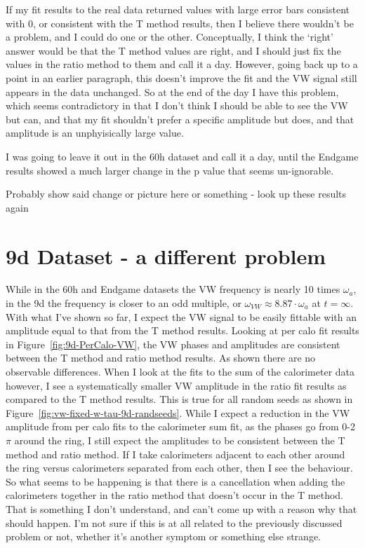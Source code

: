 \documentclass[12pt,letterpaper]{article}
\newcommand{\figref}[1]{Figure~\ref{#1}}
\def\wa{$\omega_{a}$\xspace}
\begin{document}
If my fit results to the real data returned values with large error bars consistent with 0, or consistent with the T method results, then I believe there wouldn't be a problem, and I could do one or the other. Conceptually, I think the `right' answer would be that the T method values are right, and I should just fix the values in the ratio method to them and call it a day. However, going back up to a point in an earlier paragraph, this doesn't improve the fit and the VW signal still appears in the data unchanged. So at the end of the day I have this problem, which seems contradictory in that I don't think I should be able to see the VW but can, and that my fit shouldn't prefer a specific amplitude but does, and that amplitude is an unphyisically large value. 


I was going to leave it out in the 60h dataset and call it a day, until the Endgame results showed a much larger change in the p value that seems un-ignorable.


Probably show said change or picture here or something - look up these results again






\section{9d Dataset - a different problem}


While in the 60h and Endgame datasets the VW frequency is nearly 10 times \wa, in the 9d the frequency is closer to an odd multiple, or $\omega_{VW} \approx 8.87 \cdot \omega_{a}$ at $t = \infty$. With what I've shown so far, I expect the VW signal to be easily fittable with an amplitude equal to that from the T method results. Looking at per calo fit results in \figref{fig:9d-PerCalo-VW}, the VW phases and amplitudes are consistent between the T method and ratio method results. As shown there are no observable differences. When I look at the fits to the sum of the calorimeter data however, I see a systematically smaller VW amplitude in the ratio fit results as compared to the T method results. This is true for all random seeds as shown in \figref{fig:vw-fixed-w-tau-9d-randseeds}. While I expect a reduction in the VW amplitude from per calo fits to the calorimeter sum fit, as the phases go from 0-2$\pi$ around the ring, I still expect the amplitudes to be consistent between the T method and ratio method. If I take calorimeters adjacent to each other around the ring versus calorimeters separated from each other, then I see the behaviour. So what seems to be happening is that there is a cancellation when adding the calorimeters together in the ratio method that doesn't occur in the T method. That is something I don't understand, and can't come up with a reason why that should happen. I'm not sure if this is at all related to the previously discussed problem or not, whether it's another symptom or something else strange. 
\end{document}
